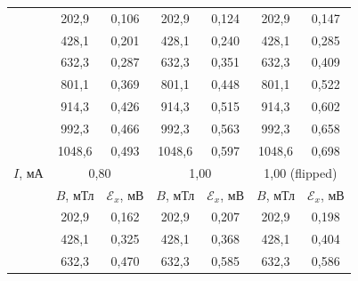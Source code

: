 \documentclass[a4paper,12pt]{article} %
\begin{document}
\begin{longtable}[c]{c|cc|cc|cc|}
	& \multicolumn{1}{c|}{202,9}   & 0,106               & \multicolumn{1}{c|}{202,9}   & 0,124               & \multicolumn{1}{c|}{202,9}   & 0,147               \\ \cline{2-7} 
	& \multicolumn{1}{c|}{428,1}   & 0,201               & \multicolumn{1}{c|}{428,1}   & 0,240               & \multicolumn{1}{c|}{428,1}   & 0,285               \\ \cline{2-7} 
	& \multicolumn{1}{c|}{632,3}   & 0,287               & \multicolumn{1}{c|}{632,3}   & 0,351               & \multicolumn{1}{c|}{632,3}   & 0,409               \\ \cline{2-7} 
	& \multicolumn{1}{c|}{801,1}   & 0,369               & \multicolumn{1}{c|}{801,1}   & 0,448               & \multicolumn{1}{c|}{801,1}   & 0,522               \\ \cline{2-7} 
	& \multicolumn{1}{c|}{914,3}   & 0,426               & \multicolumn{1}{c|}{914,3}   & 0,515               & \multicolumn{1}{c|}{914,3}   & 0,602               \\ \cline{2-7} 
	& \multicolumn{1}{c|}{992,3}   & 0,466               & \multicolumn{1}{c|}{992,3}   & 0,563               & \multicolumn{1}{c|}{992,3}   & 0,658               \\ \cline{2-7} 
	& \multicolumn{1}{c|}{1048,6}  & 0,493               & \multicolumn{1}{c|}{1048,6}  & 0,597               & \multicolumn{1}{c|}{1048,6}  & 0,698               \\ \hline
	\multicolumn{1}{|c|}{$I$, мА} & \multicolumn{2}{c|}{0,80}                          & \multicolumn{2}{c|}{1,00}                          & \multicolumn{2}{c|}{1,00 (flipped)}                \\ \hline
	& \multicolumn{1}{c|}{$B$, мТл} & $\mathcal{E}_x$, мВ & \multicolumn{1}{c|}{$B$, мТл} & $\mathcal{E}_x$, мВ & \multicolumn{1}{c|}{$B$, мТл} & $\mathcal{E}_x$, мВ \\ \cline{2-7} 
	& \multicolumn{1}{c|}{202,9}   & 0,162               & \multicolumn{1}{c|}{202,9}   & 0,207               & \multicolumn{1}{c|}{202,9}   & 0,198               \\ \cline{2-7} 
	& \multicolumn{1}{c|}{428,1}   & 0,325               & \multicolumn{1}{c|}{428,1}   & 0,368               & \multicolumn{1}{c|}{428,1}   & 0,404               \\ \cline{2-7} 
	& \multicolumn{1}{c|}{632,3}   & 0,470               & \multicolumn{1}{c|}{632,3}   & 0,585               & \multicolumn{1}{c|}{632,3}   & 0,586               \\ \cline{2-7} 

\end{longtable}
\end{document}
